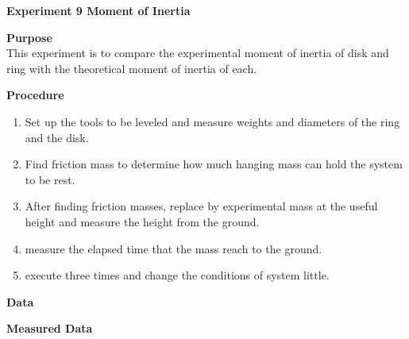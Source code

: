 \documentclass[12pt,letterpaper,fleqn]{article}
\begin{document}
\hfill
{}\hfill
\begin{center}
{\LARGE\bf Experiment 9\linebreak  
            Moment of Inertia}
\end{center}



\begin{flushleft}
{\LARGE\bf Purpose}\\
{\hspace{3pt}This experiment is to compare the experimental moment of inertia of disk and ring with the theoretical moment of inertia of each.    }
\end{flushleft}

\begin{flushleft}
{\LARGE\bf Procedure}
\begin{enumerate}
\item Set up the tools to be leveled and measure weights and diameters of the ring and the disk.
\item Find friction mass to determine how much hanging mass can hold the system to be rest. 
\item After finding friction masses, replace by experimental mass at the useful height and measure the height from the ground.
\item measure the elapsed time that the mass reach to the ground.
\item execute three times and change the conditions of system little. 
\end{enumerate}
\end{flushleft}



\begin{flushleft}
{\LARGE\bf Data}
\end{flushleft}

\begin{center}
{\large\bf Measured Data}
\end{center}
\end{document}
